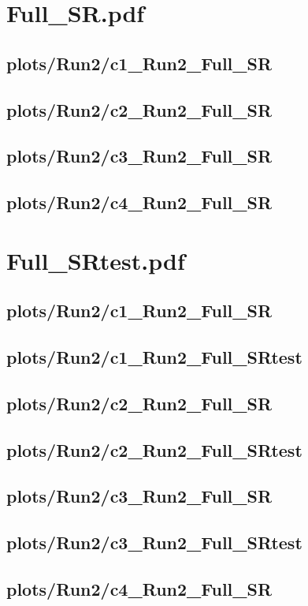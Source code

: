 \documentclass{article}
\begin{document}
    \section*{Full_SR.pdf}
      \subsection*{plots/Run2/c1\_Run2\_Full\_SR}
      \subsection*{plots/Run2/c2\_Run2\_Full\_SR}
      \subsection*{plots/Run2/c3\_Run2\_Full\_SR}
      \subsection*{plots/Run2/c4\_Run2\_Full\_SR}
    \section*{Full_SRtest.pdf}
      \subsection*{plots/Run2/c1\_Run2\_Full\_SR}
      \subsection*{plots/Run2/c1\_Run2\_Full\_SRtest}
      \subsection*{plots/Run2/c2\_Run2\_Full\_SR}
      \subsection*{plots/Run2/c2\_Run2\_Full\_SRtest}
      \subsection*{plots/Run2/c3\_Run2\_Full\_SR}
      \subsection*{plots/Run2/c3\_Run2\_Full\_SRtest}
      \subsection*{plots/Run2/c4\_Run2\_Full\_SR}
\end{document}
